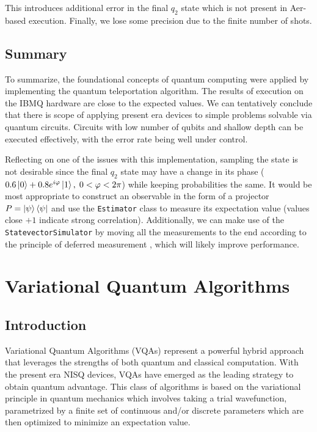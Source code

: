 \documentclass[11pt,a4paper]{article}
\begin{document}
This introduces additional error in the final $q_2$ state which is not present in Aer-based execution. Finally, we lose some precision due to the finite number of shots.

\subsection{Summary}

To summarize, the foundational concepts of quantum computing were applied by implementing the quantum teleportation algorithm. The results of execution on the IBMQ hardware are close to the expected values. We can tentatively conclude that there is scope of applying present era devices to simple problems solvable via quantum circuits. Circuits with low number of qubits and shallow depth can be executed effectively, with the error rate being well under control.

Reflecting on one of the issues with this implementation, sampling the state is not desirable since the final $q_2$ state may have a change in its phase ($0.6\ket{0} + 0.8 e^{i\varphi} \ket{1}, \; 0 < \varphi < 2\pi$) while keeping probabilities the same. It would be most appropriate to construct an observable in the form of a projector $P = \ket{\psi}\bra{\psi}$ and use the \texttt{Estimator} class to measure its expectation value (values close $+1$ indicate strong correlation). Additionally, we can make use of the \texttt{StatevectorSimulator} by moving all the measurements to the end according to the principle of deferred measurement \cite[p.~186]{nielsen_chuang}, which will likely improve performance.

\section{Variational Quantum Algorithms}

\subsection{Introduction}

Variational Quantum Algorithms (VQAs) represent a powerful hybrid approach that leverages the strengths of both quantum and classical computation. With the present era NISQ devices, VQAs have emerged as the leading strategy to obtain quantum advantage. This class of algorithms is based on the variational principle in quantum mechanics which involves taking a trial wavefunction, parametrized by a finite set of continuous and/or discrete parameters which are then optimized to minimize an expectation value.
\end{document}
